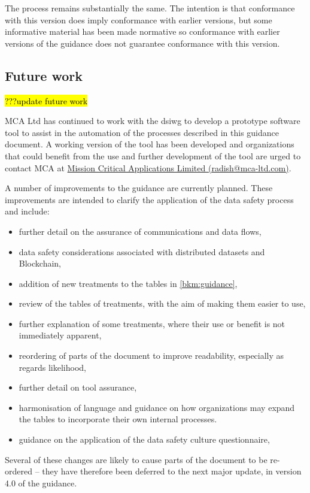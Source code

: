 The process remains substantially the same. The intention is that conformance with this version does imply conformance with earlier versions, but some informative material has been made normative so conformance with earlier versions of the guidance does not guarantee conformance with this version.\cbend\

\subsection*{Future work}\hl{???update future work}

MCA Ltd has continued to work with the \gls{dsiwg} to develop a prototype software tool to assist in the automation of the processes described in this guidance document.
A working version of the tool has been developed and organizations that could benefit from the use and further development of the tool are urged to contact MCA at \href{mailto:radish@mca-ltd.com}{Mission Critical Applications Limited (radish@mca-ltd.com)}.

A number of improvements to the guidance are currently planned.
These improvements are intended to clarify the application of the data safety process
and include:
\begin{itemize}
\item further detail on the assurance of communications and data flows,
\item data safety considerations associated with distributed \glspl{dataset} and Blockchain,
\item addition of new \glspl{treatment} to the tables in \autoref{bkm:guidance},
\item review of the tables of \glspl{treatment}, with the aim of making them easier to use,
\item further explanation of some \glspl{treatment}, where their use or benefit is not immediately apparent, 
\item reordering of parts of the document to improve readability, especially as regards likelihood, 
\item further detail on tool assurance,
\item harmonisation of language and guidance on how organizations may expand the tables to incorporate their own internal processes.
\item guidance on the application of the data safety culture questionnaire,
\end{itemize}
Several of these changes are likely to
cause parts of the document to be re-ordered -- they have therefore been deferred to the next major update, in version 4.0 of the guidance.

